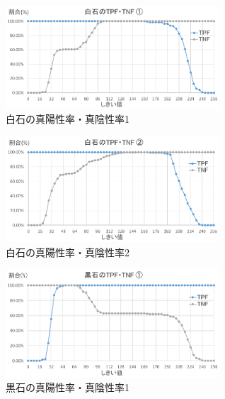 \documentclass[openright]{nitocs}
\numberwithin{equation}{section}
\begin{document}
            \begin{figure}[tb] %
                \begin{center}
                \includegraphics[clip,width=80mm]{Case1_White_TPF_TNF.eps} 
                \caption{白石の真陽性率・真陰性率1}
                \label{Case1White}
                \end{center}
            \end{figure}
            
            \begin{figure}[tb] %
                \begin{center}
                \includegraphics[clip,width=80mm]{Case2_White_TPF_TNF.eps} 
                \caption{白石の真陽性率・真陰性率2}
                \label{Case2White}
                \end{center}
            \end{figure}

            \begin{figure}[tb] %
                \begin{center}
                \includegraphics[clip,width=80mm]{Case1_Black_TPF_TNF.eps} 
                \caption{黒石の真陽性率・真陰性率1}
                \label{Case1Black}
                \end{center}
            \end{figure}
\end{document}
